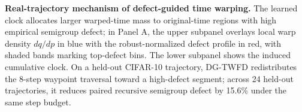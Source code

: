 \textbf{Real-trajectory mechanism of defect-guided time warping.}
The learned clock allocates larger warped-time mass to original-time regions with high empirical semigroup defect; in Panel A, the upper subpanel overlays local warp density $dq/dp$ in blue with the robust-normalized defect profile in red, with shaded bands marking top-defect bins.
The lower subpanel shows the induced cumulative clock.
On a held-out CIFAR-10 trajectory, DG-TWFD redistributes the 8-step waypoint traversal toward a high-defect segment; across 24 held-out trajectories, it reduces paired recursive semigroup defect by 15.6\% under the same step budget.
